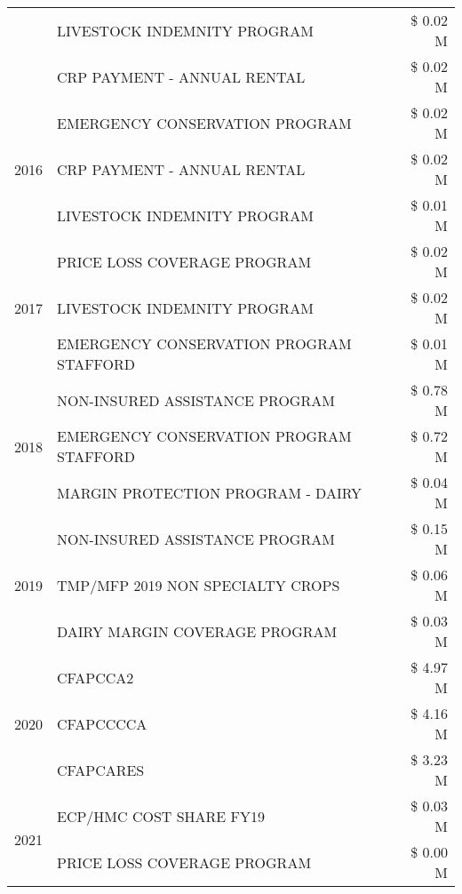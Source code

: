\begin{tabular}{llr}
 & LIVESTOCK INDEMNITY PROGRAM & \$ 0.02 M \\
 & CRP PAYMENT - ANNUAL RENTAL & \$ 0.02 M \\
\cline{1-3}
\multirow[t]{3}{*}{2016} & EMERGENCY CONSERVATION PROGRAM & \$ 0.02 M \\
 & CRP PAYMENT - ANNUAL RENTAL & \$ 0.02 M \\
 & LIVESTOCK INDEMNITY PROGRAM & \$ 0.01 M \\
\cline{1-3}
\multirow[t]{3}{*}{2017} & PRICE LOSS COVERAGE PROGRAM & \$ 0.02 M \\
 & LIVESTOCK INDEMNITY PROGRAM & \$ 0.02 M \\
 & EMERGENCY CONSERVATION PROGRAM STAFFORD & \$ 0.01 M \\
\cline{1-3}
\multirow[t]{3}{*}{2018} & NON-INSURED ASSISTANCE PROGRAM & \$ 0.78 M \\
 & EMERGENCY CONSERVATION PROGRAM STAFFORD & \$ 0.72 M \\
 & MARGIN PROTECTION PROGRAM - DAIRY & \$ 0.04 M \\
\cline{1-3}
\multirow[t]{3}{*}{2019} & NON-INSURED ASSISTANCE PROGRAM & \$ 0.15 M \\
 & TMP/MFP 2019 NON SPECIALTY CROPS & \$ 0.06 M \\
 & DAIRY MARGIN COVERAGE PROGRAM & \$ 0.03 M \\
\cline{1-3}
\multirow[t]{3}{*}{2020} & CFAPCCA2 & \$ 4.97 M \\
 & CFAPCCCCA & \$ 4.16 M \\
 & CFAPCARES & \$ 3.23 M \\
\cline{1-3}
\multirow[t]{2}{*}{2021} & ECP/HMC COST SHARE FY19 & \$ 0.03 M \\
 & PRICE LOSS COVERAGE PROGRAM & \$ 0.00 M \\
\cline{1-3}
\bottomrule
\end{tabular}
